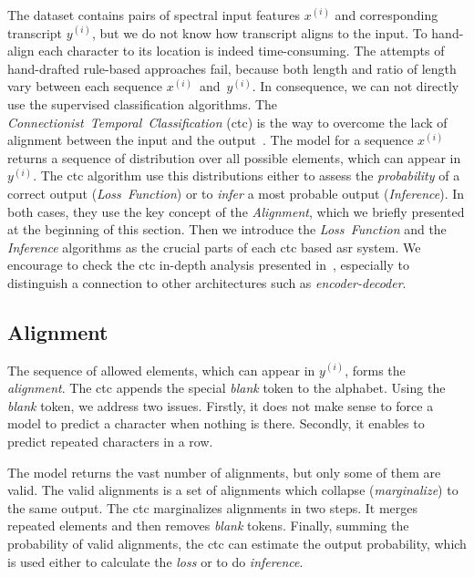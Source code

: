 The dataset contains pairs of spectral input features $x^{(i)}$ and corresponding transcript $y^{(i)}$, but
we do not know how transcript aligns to the input.
To hand-align each character to its location is indeed time-consuming.
The attempts of hand-drafted rule-based approaches fail,
because both length and ratio of length vary between each sequence $x^{(i)}$~and~$y^{(i)}$.
In consequence, we can not directly use the supervised classification algorithms.
The \textit{Connectionist~Temporal~Classification} (\acrshort{ctc}) is the way
to overcome the lack of alignment between the input and the output~\cite{graves2006}.
The model for a sequence $x^{(i)}$ returns a sequence of distribution over all possible elements,
which can appear in $y^{(i)}$.
The \acrshort{ctc} algorithm use this distributions either to assess the \textit{probability} of a correct output
(\textit{Loss~Function}) or to \textit{infer} a most probable output (\textit{Inference}).
In both cases, they use the key concept of the \textit{Alignment}, which we briefly presented at the
beginning of this section.
Then we introduce the \textit{Loss~Function} and the \textit{Inference} algorithms as the crucial parts of
each \acrshort{ctc} based \acrshort{asr} system.
We encourage to check the \acrshort{ctc} in-depth analysis presented in~\cite{hannun2017}, especially
to distinguish a connection to other architectures such as \textit{encoder-decoder}.


\subsection{Alignment}\label{subsec:alignment}

The sequence of allowed elements, which can appear in $y^{(i)}$, forms the \textit{alignment}.
The \acrshort{ctc} appends the special \textit{blank} token to the alphabet.
Using the \textit{blank} token, we address two issues.
Firstly, it does not make sense to force a model to predict a character when nothing is there.
Secondly, it enables to predict repeated characters in a row.


The model returns the vast number of alignments, but only some of them are valid.
The valid alignments is a set of alignments which collapse (\textit{marginalize}) to the same output.
The \acrshort{ctc} marginalizes alignments in two steps.
It merges repeated elements and then removes \textit{blank} tokens.
Finally, summing the probability of valid alignments, the \acrshort{ctc} can estimate the output probability,
which is used either to calculate the \textit{loss} or to do \textit{inference}.

